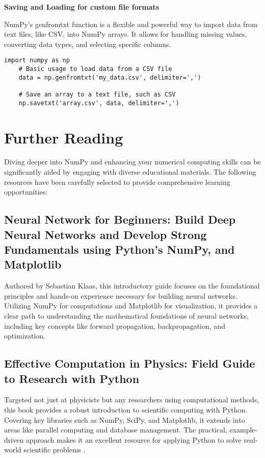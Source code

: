 \textbf{Saving and Loading for custom file formats}

NumPy's genfromtxt function is a flexible and powerful way to import data from text files, like CSV, into NumPy arrays. It allows for handling missing values, converting data types, and selecting specific columns.

\begin{lstlisting}[caption={Example code for loading and saving data using NumPy}, label={code:numpy-load-save}, style=pythonstyle]
	import numpy as np
	# Basic usage to load data from a CSV file
	data = np.genfromtxt('my_data.csv', delimiter=',')
	
	# Save an array to a text file, such as CSV
	np.savetxt('array.csv', data, delimiter=',')
\end{lstlisting}


\section{Further Reading}

Diving deeper into NumPy and enhancing your numerical computing skills can be significantly aided by engaging with diverse educational materials. The following resources have been carefully selected to provide comprehensive learning opportunities:

\subsection{Neural Network for Beginners: Build Deep Neural Networks and Develop Strong Fundamentals using Python’s NumPy, and Matplotlib}
Authored by Sebastian Klaas, this introductory guide focuses on the foundational principles and hands-on experience necessary for building neural networks. Utilizing NumPy for computations and Matplotlib for visualization, it provides a clear path to understanding the mathematical foundations of neural networks, including key concepts like forward propagation, backpropagation, and optimization\cite{Sewak:2018}.

\subsection{Effective Computation in Physics: Field Guide to Research with Python}
Targeted not just at physicists but any researchers using computational methods, this book provides a robust introduction to scientific computing with Python. Covering key libraries such as NumPy, SciPy, and Matplotlib, it extends into areas like parallel computing and database management. The practical, example-driven approach makes it an excellent resource for applying Python to solve real-world scientific problems \cite{McKinney:2011}.

